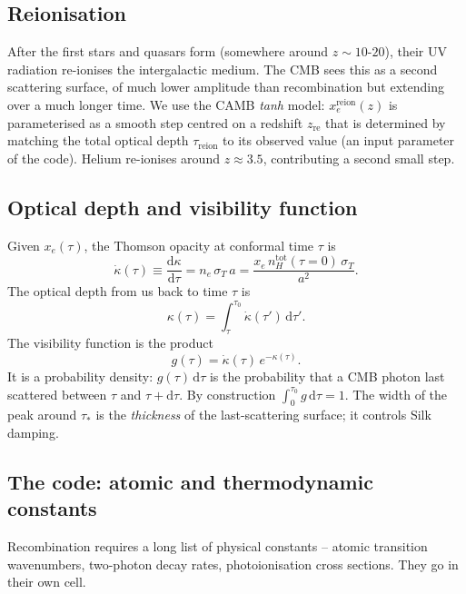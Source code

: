 \subsection{Reionisation}

After the first stars and quasars form (somewhere around $z \sim 10$-$20$), their UV radiation re-ionises the intergalactic medium. The CMB sees this as a second scattering surface, of much lower amplitude than recombination but extending over a much longer time. We use the CAMB \emph{tanh} model: $x_e^\mathrm{reion}(z)$ is parameterised as a smooth step centred on a redshift $z_\mathrm{re}$ that is determined by matching the total optical depth $\tau_\mathrm{reion}$ to its observed value (an input parameter of the code). Helium re-ionises around $z \approx 3.5$, contributing a second small step.

\subsection{Optical depth and visibility function}

Given $x_e(\tau)$, the Thomson opacity at conformal time $\tau$ is
\begin{equation}
  \dot\kappa(\tau) \equiv \frac{\mathrm{d}\kappa}{\mathrm{d}\tau} = n_e\, \sigma_T\, a = \frac{x_e\, n_H^\mathrm{tot}(\tau=0)\, \sigma_T}{a^2}.
\end{equation}
The optical depth from us back to time $\tau$ is
\begin{equation}
  \kappa(\tau) = \int_\tau^{\tau_0} \dot\kappa(\tau')\, \mathrm{d}\tau'.
\end{equation}
The visibility function is the product
\begin{equation}
  g(\tau) = \dot\kappa(\tau)\, e^{-\kappa(\tau)}.
  \label{eq:visibility}
\end{equation}
It is a probability density: $g(\tau)\,\mathrm{d}\tau$ is the probability that a CMB photon last scattered between $\tau$ and $\tau + \mathrm{d}\tau$. By construction $\int_0^{\tau_0} g\, \mathrm{d}\tau = 1$. The width of the peak around $\tau_*$ is the \emph{thickness} of the last-scattering surface; it controls Silk damping.

\subsection{The code: atomic and thermodynamic constants}

Recombination requires a long list of physical constants -- atomic transition wavenumbers, two-photon decay rates, photoionisation cross sections. They go in their own cell.


